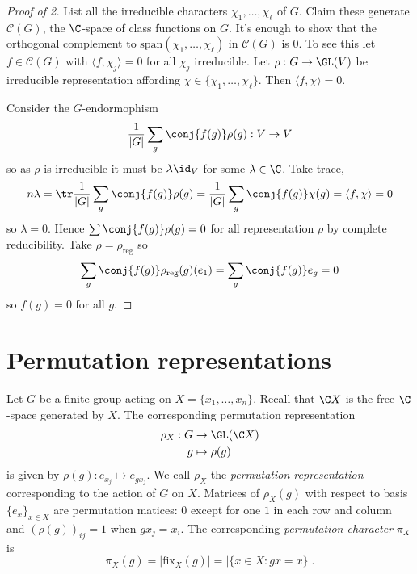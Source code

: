 \documentclass[a4paper]{article}
\theoremstyle{definition}
\begin{document}
\begin{proof}[Proof of  2]
  List all the irreducible characters \(\chi_1, \dots, \chi_\ell\) of \(G\). Claim these generate \(\mathcal C(G)\), the \(\C\)-space of class functions on \(G\). It's enough to show that the orthogonal complement to \(\text{span} (\chi_1, \dots, \chi_\ell)\) in \(\mathcal C(G)\) is \(0\). To see this let \(f \in \mathcal C(G)\) with \(\langle f, \chi_j \rangle = 0\) for all \(\chi_j\) irreducible. Let \(\rho: G \to \GL(V)\) be irreducible representation affording \(\chi \in \{\chi_1, \dots, \chi_\ell\}\). Then \(\langle f, \chi \rangle = 0\).

  Consider the \(G\)-endormophism
  \[
    \frac{1}{|G|} \sum_g \conj{f(g)} \rho(g): V \to V
  \]
  so as \(\rho\) is irreducible it must be \(\lambda \id_V\) for some \(\lambda \in \C\). Take trace,
  \[
    n \lambda
    = \tr \frac{1}{|G|} \sum_g \conj{f(g)} \rho(g)
    = \frac{1}{|G|} \sum_g \conj{f(g)} \chi(g)
    = \langle f, \chi \rangle
    = 0
  \]
  so \(\lambda = 0\). Hence \(\sum \conj{f(g)} \rho(g) = 0\) for all representation \(\rho\) by complete reducibility. Take \(\rho = \rho_{\text{reg}}\) so
  \[
    \sum_g \conj{f(g)} \rho_{\text{reg}}(g)(e_1) = \sum_g \conj{f(g)} e_g = 0
  \]
  so \(f(g) = 0\) for all \(g\).
\end{proof}

\section{Permutation representations}

Let \(G\) be a finite group acting on \(X = \{x_1, \dots, x_n\}\). Recall that \(\C X\) is the free \(\C\)-space generated by \(X\). The corresponding permutation representation
\begin{align*}
  \rho_X: G &\to \GL(\C X) \\
  g &\mapsto \rho(g)
\end{align*}
is given by \(\rho(g): e_{x_j} \mapsto e_{gx_j}\). We call \(\rho_X\) the \emph{permutation representation} corresponding to the action of \(G\) on \(X\). Matrices of \(\rho_X(g)\) with respect to basis \(\{e_x\}_{x \in X}\) are permutation matices: \(0\) except for one \(1\) in each row and column and \((\rho(g))_{ij} = 1\) when \(gx_j = x_i\). The corresponding \emph{permutation character} \(\pi_X\) is
\[
  \pi_X(g) = |\text{fix}_X(g)| = |\{x \in X: gx = x\}|.
\]
\end{document}
